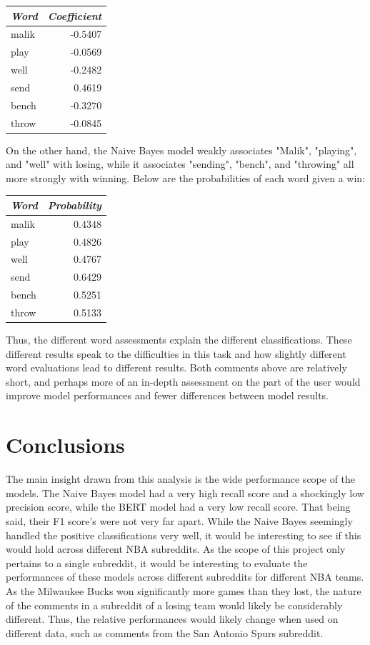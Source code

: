 \documentclass[twocolumn]{article}
\begin{document}
\begin{table}[H]
\centering
\begin{tabular}{l r}
\textit{Word} & \textit{Coefficient} \\ \hline
malik & -0.5407 \\
play & -0.0569 \\
well & -0.2482 \\
send & 0.4619 \\
bench & -0.3270 \\
throw & -0.0845 \\
\hline
\end{tabular}
\end{table}

On the other hand, the Naive Bayes model weakly associates "Malik", "playing", and "well" with losing, while it associates "sending", "bench", and "throwing" all more strongly with winning. Below are the probabilities of each word given a  win:

\begin{table}[H]
\centering
\begin{tabular}{l r}
\textit{Word} & \textit{Probability} \\ \hline
malik & 0.4348 \\
play & 0.4826 \\
well & 0.4767 \\
send & 0.6429 \\
bench & 0.5251 \\
throw & 0.5133 \\
\hline
\end{tabular}
\end{table}

Thus, the different word assessments explain the different classifications. These different results speak to the difficulties in this task and how slightly different word evaluations lead to different results. Both comments above are relatively short, and perhaps more of an in-depth assessment on the part of the user would improve model performances and fewer differences between model results.

\section{Conclusions}
The main insight drawn from this analysis is the wide performance scope of the models. The Naive Bayes model had a very high recall score and a shockingly low precision score, while the BERT model had a very low recall score. That being said, their F1 score's were not very far apart. While the Naive Bayes seemingly handled the positive classifications very well, it would be interesting to see if this would hold across different NBA subreddits. As the scope of this project only pertains to a single subreddit, it would be interesting to evaluate the performances of these models across different subreddits for different NBA teams. As the Milwaukee Bucks won significantly more games than they lost, the nature of the comments in a subreddit of a losing team would likely be considerably different. Thus, the relative performances would likely change when used on different data, such as comments from the San Antonio Spurs subreddit. 
\end{document}
